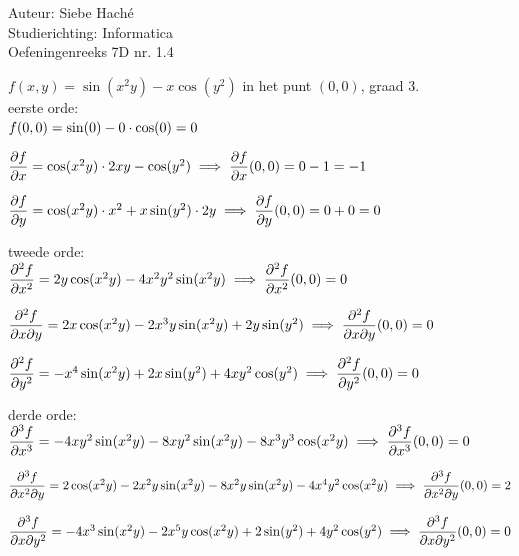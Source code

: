 \documentclass[a4paper]{article}
\begin{document}
\noindent \large Auteur: Siebe Haché \\
\noindent \large Studierichting: Informatica \\
\noindent \large Oefeningenreeks 7D nr. 1.4\\

\medskip
\normalsize

$f(x,y) = \sin(x^2y) - x \cos(y^2)$ in het punt $(0,0)$, graad 3. \\

eerste orde: \\

$f(0,0) = \sin(0) - 0 \cdot \cos(0) = 0 \\$

$\dfrac{\partial f}{\partial x} = \cos(x^2y) \cdot 2xy - \cos(y^2) \implies \dfrac{\partial f}{\partial x}(0,0) = 0 - 1 = -1 \\$

$\dfrac{\partial f}{\partial y} = \cos(x^2y) \cdot x^2 + x \sin(y^2) \cdot 2y \implies \dfrac{\partial f}{\partial y}(0,0) = 0 + 0 = 0 \\$

tweede orde: \\

$\dfrac{\partial^2 f}{\partial x^2} = 2y \cos(x^2y) - 4x^2y^2 \sin(x^2y) \implies \dfrac{\partial^2 f}{\partial x^2}(0,0) = 0 \\$

$\dfrac{\partial^2 f}{\partial x \partial y} = 2x \cos(x^2y) - 2x^3y \sin(x^2y) + 2y \sin(y^2) \implies \dfrac{\partial^2 f}{\partial x \partial y}(0,0) = 0 \\$

$\dfrac{\partial^2 f}{\partial y^2} = -x^4 \sin(x^2y) + 2x \sin(y^2) + 4xy^2 \cos(y^2) \implies \dfrac{\partial^2 f}{\partial y^2}(0,0) = 0 \\$

derde orde: \\

$\dfrac{\partial^3 f}{\partial x^3} = -4xy^2 \sin(x^2y) - 8xy^2 \sin(x^2y) - 8x^3y^3 \cos(x^2y) \implies \dfrac{\partial^3 f}{\partial x^3}(0,0) = 0 \\$

$\dfrac{\partial^3 f}{\partial x^2 \partial y} = 2 \cos(x^2y) - 2x^2y \sin(x^2y) - 8x^2y \sin(x^2y) - 4x^4y^2 \cos(x^2y) \implies \dfrac{\partial^3 f}{\partial x^2 \partial y}(0,0) = 2 \\$

$\dfrac{\partial^3 f}{\partial x \partial y^2} = -4x^3 \sin(x^2y) - 2x^5y \cos(x^2y) + 2\sin(y^2) + 4y^2 \cos(y^2) \implies \dfrac{\partial^3 f}{\partial x \partial y^2}(0,0) = 0 \\$
\end{document}
